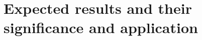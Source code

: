 \documentclass[12pt]{amsart}
\begin{document}

\section{Expected results and their significance and application}
\end{document}
